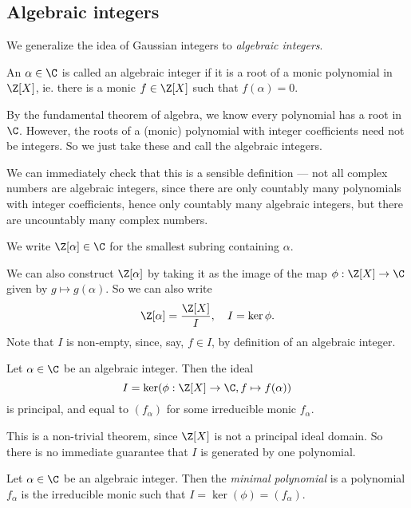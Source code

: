 \documentclass[a4paper]{article}
\begin{document}
\subsection{Algebraic integers}
We generalize the idea of Gaussian integers to \emph{algebraic integers}.

\begin{defi}
  An $\alpha \in \C$ is called an algebraic integer if it is a root of a monic polynomial in $\Z[X]$, ie. there is a monic $f \in \Z[X]$ such that $f(\alpha) = 0$.
\end{defi}
By the fundamental theorem of algebra, we know every polynomial has a root in $\C$. However, the roots of a (monic) polynomial with integer coefficients need not be integers. So we just take these and call the algebraic integers.

We can immediately check that this is a sensible definition --- not all complex numbers are algebraic integers, since there are only countably many polynomials with integer coefficients, hence only countably many algebraic integers, but there are uncountably many complex numbers.

\begin{notation}
  We write $\Z[\alpha] \in \C$ for the smallest subring containing $\alpha$.
\end{notation}
We can also construct $\Z[\alpha]$ by taking it as the image of the map $\phi: \Z[X] \to \C$ given by $g \mapsto g(\alpha)$. So we can also write
\[
  \Z[\alpha] = \frac{\Z[X]}{I},\quad I = \ker \phi.
\]
Note that $I$ is non-empty, since, say, $f \in I$, by definition of an algebraic integer.
\begin{prop}
  Let $\alpha \in \C$ be an algebraic integer. Then the ideal
  \[
    I = \ker(\phi: \Z[X] \to \C, f \mapsto f(\alpha))
  \]
  is principal, and equal to $(f_\alpha)$ for some irreducible monic $f_\alpha$.
\end{prop}
This is a non-trivial theorem, since $\Z[X]$ is not a principal ideal domain. So there is no immediate guarantee that $I$ is generated by one polynomial.

\begin{defi}
  Let $\alpha \in \C$ be an algebraic integer. Then the \emph{minimal polynomial} is a polynomial $f_\alpha$ is the irreducible monic such that $I = \ker(\phi) = (f_\alpha)$.
\end{defi}
\end{document}
